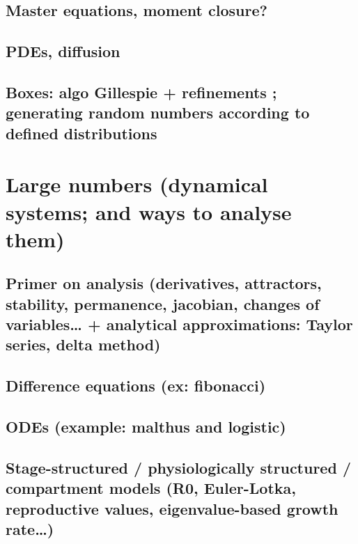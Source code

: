 \documentclass[
]{book}
\theoremstyle{definition}
\theoremstyle{definition}
\theoremstyle{definition}
\theoremstyle{definition}
\theoremstyle{remark}
\begin{document}
\subsection{Master equations, moment closure?}\label{master-equations-moment-closure}

\subsection{PDEs, diffusion}\label{pdes-diffusion}

\subsection{Boxes: algo Gillespie + refinements ; generating random numbers according to defined distributions}\label{boxes-algo-gillespie-refinements-generating-random-numbers-according-to-defined-distributions}

\section{Large numbers (dynamical systems; and ways to analyse them)}\label{large-numbers-dynamical-systems-and-ways-to-analyse-them}

\subsection{Primer on analysis (derivatives, attractors, stability, permanence, jacobian, changes of variables\ldots{} + analytical approximations: Taylor series, delta method)}\label{primer-on-analysis-derivatives-attractors-stability-permanence-jacobian-changes-of-variables-analytical-approximations-taylor-series-delta-method}

\subsection{Difference equations (ex: fibonacci)}\label{difference-equations-ex-fibonacci}

\subsection{ODEs (example: malthus and logistic)}\label{odes-example-malthus-and-logistic}

\subsection{Stage-structured / physiologically structured / compartment models (R0, Euler-Lotka, reproductive values, eigenvalue-based growth rate\ldots)}\label{stage-structured-physiologically-structured-compartment-models-r0-euler-lotka-reproductive-values-eigenvalue-based-growth-rate}
\end{document}
